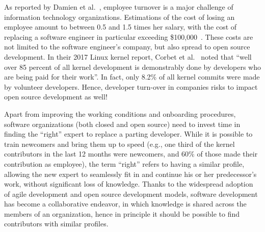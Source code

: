 As reported by Damien et al.~\citep{turnover}, employee turnover is a major challenge of information technology organizations. Estimations of the cost of losing an employee amount to between 0.5 and 1.5 times her salary, with the cost of replacing a software engineer in particular exceeding \$100,000~\citep{economist5988}. These costs are not limited to the software engineer's company, but also spread to open source development. In their 2017 Linux kernel report, Corbet et al.~\citep{corbet17} noted that ``well over 85 percent of all kernel development is demonstrably done by developers who are being paid for their work''. In fact, only 8.2\% of all kernel commits were made by volunteer developers. Hence, developer turn-over in companies risks to impact open source development as well!
%
%

Apart from improving the working conditions and onboarding procedures, software organizations (both closed and open source) need to invest time in finding the ``right'' expert to replace a parting developer. While it is possible to train newcomers and bring them up to speed (e.g., one third of the kernel contributors in the last 12 months were newcomers, and 60\% of those made their contribution as employee), the term ``right'' refers to having a similar profile, allowing the new expert to seamlessly fit in and continue his or her predecessor's work, without significant loss of knowledge. Thanks to the widespread adoption of agile development and open source development models, software development has become a collaborative endeavor, in which knowledge is shared across the members of an organization, hence in principle it should be possible to find contributors with similar profiles.

